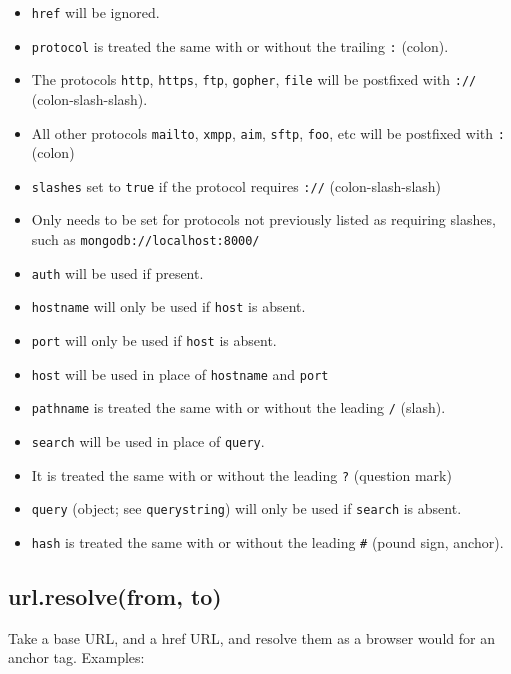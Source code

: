 \begin{itemize}
\itemsep1pt\parskip0pt
\item
  \texttt{href} will be ignored.
\item
  \texttt{protocol} is treated the same with or without the trailing
  \texttt{:} (colon).
\item
  The protocols \texttt{http}, \texttt{https}, \texttt{ftp},
  \texttt{gopher}, \texttt{file} will be postfixed with \texttt{://}
  (colon-slash-slash).
\item
  All other protocols \texttt{mailto}, \texttt{xmpp}, \texttt{aim},
  \texttt{sftp}, \texttt{foo}, etc will be postfixed with \texttt{:}
  (colon)
\item
  \texttt{slashes} set to \texttt{true} if the protocol requires
  \texttt{://} (colon-slash-slash)
\item
  Only needs to be set for protocols not previously listed as requiring
  slashes, such as \texttt{mongodb://localhost:8000/}
\item
  \texttt{auth} will be used if present.
\item
  \texttt{hostname} will only be used if \texttt{host} is absent.
\item
  \texttt{port} will only be used if \texttt{host} is absent.
\item
  \texttt{host} will be used in place of \texttt{hostname} and
  \texttt{port}
\item
  \texttt{pathname} is treated the same with or without the leading
  \texttt{/} (slash).
\item
  \texttt{search} will be used in place of \texttt{query}.
\item
  It is treated the same with or without the leading \texttt{?}
  (question mark)
\item
  \texttt{query} (object; see \texttt{querystring}) will only be used if
  \texttt{search} is absent.
\item
  \texttt{hash} is treated the same with or without the leading
  \texttt{\#} (pound sign, anchor).
\end{itemize}

\subsection{url.resolve(from, to)}\label{url.resolvefrom-to}

Take a base URL, and a href URL, and resolve them as a browser would for
an anchor tag. Examples:

